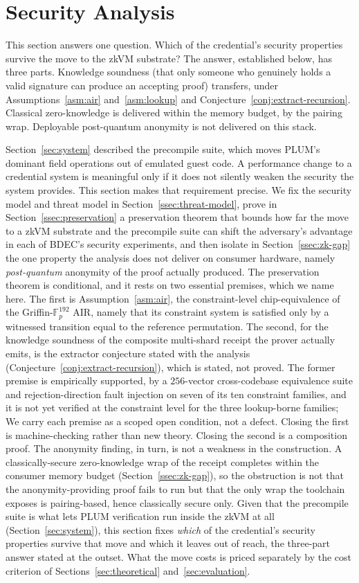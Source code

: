 \section{Security Analysis}\label{sec:security}
This section answers one question. Which of the credential's security properties survive the move to the zkVM substrate? The answer, established below, has three parts. Knowledge soundness (that only someone who genuinely holds a valid signature can produce an accepting proof) transfers, under Assumptions~\ref{asm:air} and~\ref{asm:lookup} and Conjecture~\ref{conj:extract-recursion}. Classical zero-knowledge is delivered within the memory budget, by the pairing wrap. Deployable post-quantum anonymity is not delivered on this stack.

Section~\ref{sec:system} described the precompile suite, which moves PLUM's dominant field operations out of emulated guest code. A performance change to a credential system is meaningful only if it does not silently weaken the security the system provides. This section makes that requirement precise. We fix the security model and threat model in Section~\ref{ssec:threat-model}, prove in Section~\ref{ssec:preservation} a preservation theorem that bounds how far the move to a zkVM substrate and the precompile suite can shift the adversary's advantage in each of BDEC's security experiments, and then isolate in Section~\ref{ssec:zk-gap} the one property the analysis does not deliver on consumer hardware, namely \emph{post-quantum} anonymity of the proof actually produced. The preservation theorem is conditional, and it rests on two essential premises, which we name here. The first is Assumption~\ref{asm:air}, the constraint-level chip-equivalence of the Griffin-$\mathbb{F}_p^{192}$ AIR, namely that its constraint system is satisfied only by a witnessed transition equal to the reference permutation. The second, for the knowledge soundness of the composite multi-shard receipt the prover actually emits, is the extractor conjecture stated with the analysis (Conjecture~\ref{conj:extract-recursion}), which is stated, not proved. The former premise is empirically supported, by a $256$-vector cross-codebase equivalence suite and rejection-direction fault injection on seven of its ten constraint families, and it is not yet verified at the constraint level for the three lookup-borne families; We carry each premise as a scoped open condition, not a defect. Closing the first is machine-checking rather than new theory. Closing the second is a composition proof. The anonymity finding, in turn, is not a weakness in the construction. A classically-secure zero-knowledge wrap of the receipt completes within the consumer memory budget (Section~\ref{ssec:zk-gap}), so the obstruction is not that the anonymity-providing proof fails to run but that the only wrap the toolchain exposes is pairing-based, hence classically secure only. Given that the precompile suite is what lets PLUM verification run inside the zkVM at all (Section~\ref{sec:system}), this section fixes \emph{which} of the credential's security properties survive that move and which it leaves out of reach, the three-part answer stated at the outset. What the move costs is priced separately by the cost criterion of Sections~\ref{sec:theoretical} and~\ref{sec:evaluation}.

